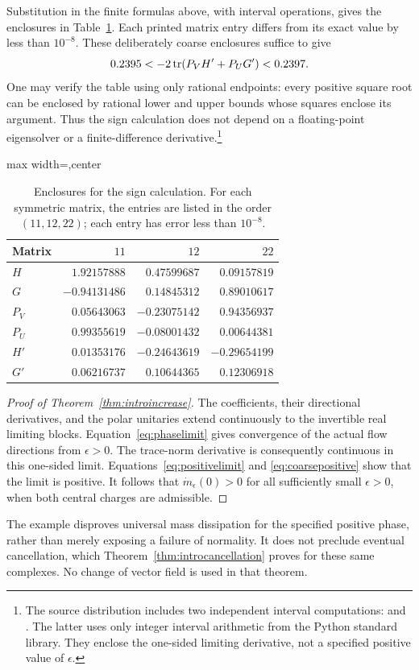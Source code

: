 Substitution in the finite formulas above, with interval operations,
gives the enclosures in Table~\ref{tab:intervals}. Each printed matrix
entry differs from its exact value by less than $10^{-8}$.
These deliberately coarse enclosures suffice to give
\begin{equation}\label{eq:coarsepositive}
 0.2395<-2\operatorname{tr}(P_VH'+P_UG')<0.2397.
\end{equation}
One may verify the table using only rational endpoints: every positive
square root can be enclosed by rational lower and upper bounds whose
squares enclose its argument. Thus the sign calculation does not
depend on a floating-point eigensolver or a finite-difference derivative.\footnote{The
source distribution includes two independent interval computations:
 and
. The latter uses only
integer interval arithmetic from the Python standard library. They
enclose the one-sided limiting derivative, not a specified positive
value of $\epsilon$.}

\begin{table}[ht]
\caption{Enclosures for the sign calculation. For each symmetric matrix,
the entries are listed in the order $(11,12,22)$; each entry has error
less than $10^{-8}$.}\label{tab:intervals}
\centering
\begin{adjustbox}{max width=\textwidth,center}
\begin{tabular}{lrrr}
\toprule
Matrix & $11$ & $12$ & $22$\\
\midrule
$H$   & $1.92157888$ & $0.47599687$ & $0.09157819$\\
$G$   & $-0.94131486$ & $0.14845312$ & $0.89010617$\\
$P_V$ & $0.05643063$ & $-0.23075142$ & $0.94356937$\\
$P_U$ & $0.99355619$ & $-0.08001432$ & $0.00644381$\\
$H'$  & $0.01353176$ & $-0.24643619$ & $-0.29654199$\\
$G'$  & $0.06216737$ & $0.10644365$ & $0.12306918$\\
\bottomrule
\end{tabular}
\end{adjustbox}
\end{table}

\begin{proof}[Proof of Theorem~\ref{thm:introincrease}]
The coefficients, their directional derivatives, and the polar
unitaries extend continuously to the invertible real limiting blocks.
Equation~\eqref{eq:phaselimit} gives convergence of the actual flow
directions from $\epsilon>0$. The trace-norm derivative is consequently
continuous in this one-sided limit. Equations~\eqref{eq:positivelimit}
and \eqref{eq:coarsepositive} show that the limit is positive.
It follows that $\dot m_\epsilon(0)>0$ for all sufficiently small
$\epsilon>0$, when both central charges are admissible.
\end{proof}

The example disproves universal mass dissipation for the specified
positive phase, rather than merely exposing a failure of normality.
It does not preclude eventual cancellation, which
Theorem~\ref{thm:introcancellation} proves for these same complexes.
No change of vector field is used in that theorem.
